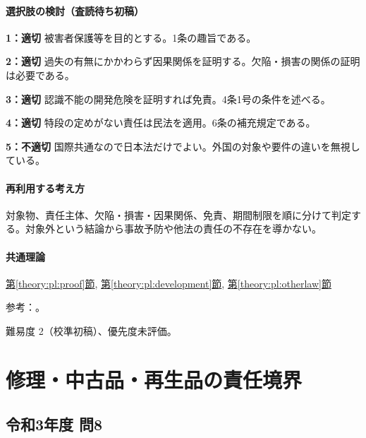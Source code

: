 \paragraph{選択肢の検討（査読待ち初稿）}\mbox{}\par

\noindent\textbf{1：適切} 被害者保護等を目的とする。1条の趣旨である。\par

\noindent\textbf{2：適切} 過失の有無にかかわらず因果関係を証明する。欠陥・損害の関係の証明は必要である。\par

\noindent\textbf{3：適切} 認識不能の開発危険を証明すれば免責。4条1号の条件を述べる。\par

\noindent\textbf{4：適切} 特段の定めがない責任は民法を適用。6条の補充規定である。\par

\noindent\textbf{5：不適切} 国際共通なので日本法だけでよい。外国の対象や要件の違いを無視している。\par

\paragraph{再利用する考え方} 対象物、責任主体、欠陥・損害・因果関係、免責、期間制限を順に分けて判定する。対象外という結論から事故予防や他法の責任の不存在を導かない。

\paragraph{共通理論} \hyperref[theory:pl:proof]{第\ref*{theory:pl:proof}節}, \hyperref[theory:pl:development]{第\ref*{theory:pl:development}節}, \hyperref[theory:pl:otherlaw]{第\ref*{theory:pl:otherlaw}節}

\par 参考：\cite{pl_statute,pl_qa,pl_definitions2018}。

\par 難易度 2（校準初稿）、優先度未評価。

\section{修理・中古品・再生品の責任境界}

\subsection{令和3年度 問8}
\label{q:r03-reg-apt-08}

